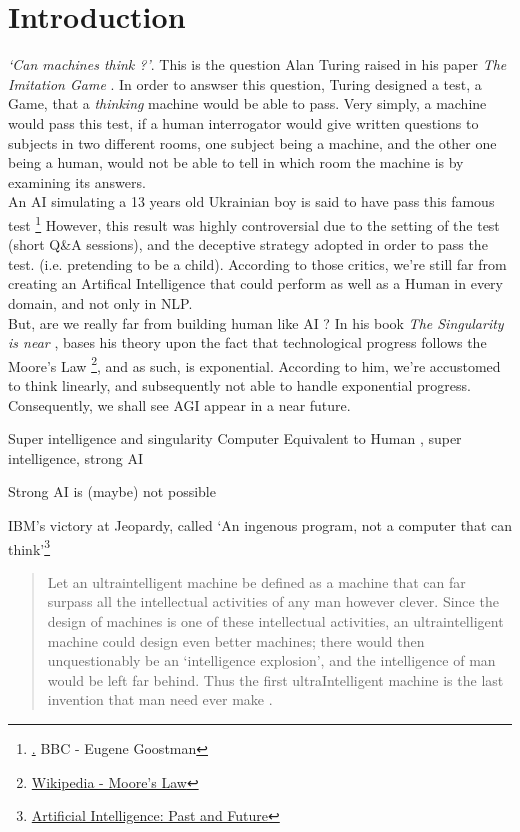 \documentclass[12pt]{article}
\begin{document}
\section*{Introduction}\label{introduction}

{\em \lq Can machines think ?\rq }. This is the question Alan Turing raised in
his paper {\em The Imitation Game} \cite{Turing}. In order to answser this
question, Turing designed a test, a Game, that a {\em thinking} machine would
be able to pass. Very simply, a machine would pass this test, if a human
interrogator would give written questions to subjects in two different rooms,
one subject being a machine, and the other one being a human, would not be able
to tell in which room the machine is by examining its answers.
\\
An AI simulating a 13 years old Ukrainian boy is said to have pass this famous
test \footnote{ \href{http://www.bbc.com/news/technology-27762088}.
{BBC - Eugene Goostman}} However, this result was highly controversial due to
the setting of the test (short Q\&A sessions), and the deceptive strategy adopted
in order to pass the test. (i.e. pretending to be a child). According to those
critics, we're still far from creating an Artifical Intelligence that could
perform as well as a Human in every domain, and not only in \gls{NLP}.
\\
But, are we really far from building human like AI ? In his book
{\em The Singularity is near} \cite{Kurzweil}, bases his theory upon the fact
that technological progress follows the Moore's Law
\footnote{ \href{https://en.wikipedia.org/wiki/Moore\%27s_law}
{Wikipedia - Moore's Law} }, and as such, is exponential. According to him, we're
accustomed to think linearly, and subsequently not able to handle exponential
progress. Consequently, we shall see \gls{AGI} appear in a near future.

Super intelligence and singularity
Computer Equivalent to Human , super intelligence, strong AI \cite{Turing}


Strong AI is (maybe) not possible \cite{ChineseRoom}

IBM's victory at Jeopardy, called \lq An ingenous program, not a computer that
can think\rq \footnote{
\href{http://cacm.acm.org/magazines/2012/1/144824-artificial-intelligence-past-and-future/fulltext}
{Artificial Intelligence: Past and Future}}



\begin{quotation}
   Let an ultraintelligent machine be defined as a machine that can far surpass
   all the intellectual activities of any man however clever. Since the design
   of machines is one of these intellectual activities, an ultraintelligent
   machine could design even better machines; there would then unquestionably be
   an \lq intelligence explosion\rq , and the intelligence of man would be left
   far behind. Thus the first ultraIntelligent machine is the last invention
   that man need ever make \cite{Good}.
\end{quotation}
\end{document}
